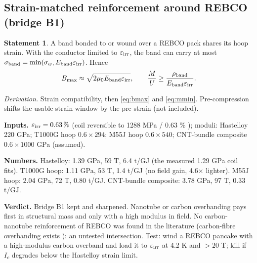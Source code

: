 \documentclass[10pt,a4paper]{article}
\newcommand{\meta}[1]{\par\noindent{\small\textsf{\color{black!60}#1}}\par\smallskip}
\newcommand{\verdict}[1]{\par\smallskip\noindent\textbf{Verdict.} #1\par}
\newcommand{\inputs}[1]{\par\noindent\textbf{Inputs.} #1\par}
\newcommand{\nums}[1]{\par\noindent\textbf{Numbers.} #1\par}
\theoremstyle{plain}
\theoremstyle{definition}
\newtheorem*{statement}{Statement}
\begin{document}
\subsection{Strain-matched reinforcement around REBCO (bridge B1)}
\meta{[E] run 3 $\cdot$ gap 6 $\times$ gap 2 $\cdot$ from I.3, I.5}
\begin{statement}
A band bonded to or wound over a REBCO pack shares its hoop strain. With the conductor limited to $\varepsilon_{\rm irr}$, the band can carry
at most $\sigma_{\rm band}=\min(\sigma_w,E_{\rm band}\varepsilon_{\rm irr})$. Hence
\begin{equation}
B_{\max}\approx\sqrt{2\mu_0E_{\rm band}\varepsilon_{\rm irr}},\qquad \frac{M}{U}\ge\frac{\rho_{\rm band}}{E_{\rm band}\varepsilon_{\rm irr}}.\label{eq:strain}
\end{equation}
\end{statement}
\noindent\emph{Derivation.} Strain compatibility, then \eqref{eq:bmax} and \eqref{eq:mmin}. Pre-compression shifts the usable strain window
by the pre-strain (not included).
\inputs{$\varepsilon_{\rm irr}=0.63\,\%$ (coil reversible to 1288 MPa / 0.63 \% \cite{jcsj}); moduli: Hastelloy 220 GPa; T1000G hoop $0.6\times294$;
M55J hoop $0.6\times540$; CNT-bundle composite $0.6\times1000$ GPa (assumed).}
\nums{Hastelloy: 1.39 GPa, 59 T, 6.4 t/GJ (the measured 1.29 GPa coil fits). T1000G hoop: 1.11 GPa, 53 T, 1.4 t/GJ (no field gain,
4.6$\times$ lighter). M55J hoop: 2.04 GPa, 72 T, 0.80 t/GJ. CNT-bundle composite: 3.78 GPa, 97 T, 0.33 t/GJ.}
\verdict{Bridge B1 kept and sharpened. Nanotube or carbon overbanding pays first in structural mass and only with a high modulus in field.
No carbon-nanotube reinforcement of REBCO was found in the literature (carbon-fibre overbanding exists \cite{pourrahimi}): an untested
intersection. Test: wind a REBCO pancake with a high-modulus carbon overband and load it to $\varepsilon_{\rm irr}$ at 4.2 K and $>20$ T;
kill if $I_c$ degrades below the Hastelloy strain limit.}
\end{document}
